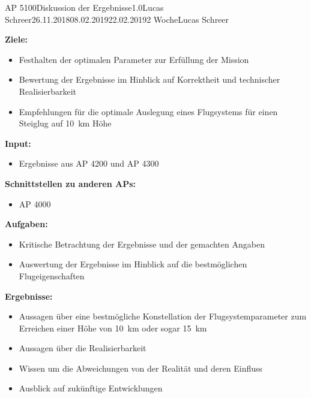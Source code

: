 \clearpage
\begin{wpd}{AP 5100}{Diskussion der Ergebnisse}{1.0}{Lucas Schreer}{26.11.2018}{08.02.2019}{22.02.2019}{2 Woche}{Lucas Schreer}
    {
    \textbf{Ziele:}
    \begin{itemize}
        \item Festhalten der optimalen Parameter zur Erfüllung der Mission
        \item Bewertung der Ergebnisse im Hinblick auf Korrektheit und technischer Realisierbarkeit
        \item Empfehlungen für die optimale Auslegung eines Flugsystems für einen Steiglug auf \SI{10}{km} Höhe
    \end{itemize}
    \textbf{Input:}
    \begin{itemize}
        \item Ergebnisse aus AP 4200 und AP 4300
    \end{itemize}
    \textbf{Schnittstellen zu anderen APs:}
    \begin{itemize}
        \item AP 4000
    \end{itemize}
    \textbf{Aufgaben:}
    \begin{itemize}        
        \item Kritische Betrachtung der Ergebnisse und der gemachten Angaben 
        \item Auswertung der Ergebnisse im Hinblick auf die bestmöglichen Flugeigenschaften
    \end{itemize}
    \textbf{Ergebnisse:}
    \begin{itemize}
        \item Aussagen über eine bestmögliche Konstellation der Flugsystemparameter zum Erreichen einer Höhe von \SI{10}{km} oder sogar \SI{15}{km}
        \item Aussagen über die Realisierbarkeit 
        \item Wissen um die Abweichungen von der Realität und deren Einfluss 
        \item Ausblick auf zukünftige Entwicklungen
    \end{itemize}
    }
\end{wpd}


